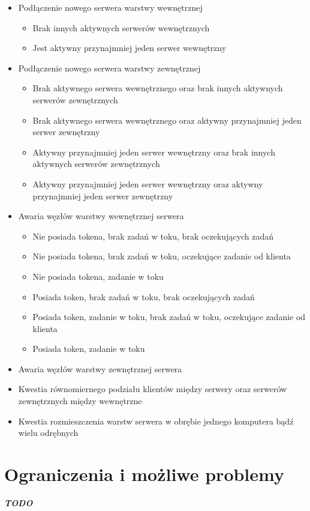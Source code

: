{\begin{itemize}
\item Podłączenie nowego serwera warstwy wewnętrznej
\begin{itemize}
\item Brak innych aktywnych serwerów wewnętrznych
\item Jest aktywny przynajmniej jeden serwer wewnętrzny
\end{itemize}
\item Podłączenie nowego serwera warstwy zewnętrznej
\begin{itemize}
\item Brak aktywnego serwera wewnętrznego oraz brak innych aktywnych serwerów zewnętrznych
\item Brak aktywnego serwera wewnętrznego oraz aktywny przynajmniej jeden serwer zewnętrzny
\item Aktywny przynajmniej jeden serwer wewnętrzny oraz brak innych aktywnych serwerów zewnętrznych
\item Aktywny przynajmniej jeden serwer wewnętrzny oraz aktywny przynajmniej jeden serwer zewnętrzny
\end{itemize}
\item Awaria węzłów warstwy wewnętrznej serwera
\begin{itemize}
\item Nie posiada tokena, brak zadań w toku, brak oczekujących zadań
\item Nie posiada tokena, brak zadań w toku, oczekujące zadanie od klienta
\item Nie posiada tokena, zadanie w toku
\item Posiada token, brak zadań w toku, brak oczekujących zadań
\item Posiada token, zadanie w toku, brak zadań w toku, oczekujące zadanie od klienta
\item Posiada token, zadanie w toku
\end{itemize}
\item Awaria węzłów warstwy zewnętrznej serwera
\item Kwestia równomiernego podziału klientów między serwery oraz serwerów zewnętrznych między wewnętrzne
\item Kwestia rozmieszczenia warstw serwera w obrębie jednego komputera bądź wielu odrębnych
\end{itemize}

\section[Ograniczenia i możliwe problemy]{Ograniczenia i możliwe problemy}
\textit{\textbf{TODO}}

}
